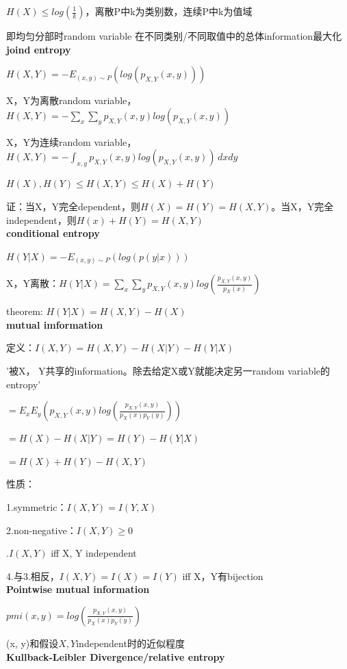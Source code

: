 \documentclass[UTF8]{ctexart}
\begin{document}
  \quad \quad $H(X) \leq log(\frac{1}{k})$，离散P中k为类别数，连续P中k为值域

  \quad \quad 即均匀分部时random variable 在不同类别/不同取值中的总体information最大化\\
\textbf{joind entropy}

  $H(X, Y) = -E_{(x, y) \sim P}(log(p_{X, Y}(x, y)))$

  X，Y为离散random variable，$H(X, Y) = -\sum_x\sum_yp_{X, Y}(x, y)log(p_{X, Y}(x, y))$

  X，Y为连续random variable，$H(X, Y) = -\int_{x, y} p_{X, Y}(x, y)log(p_{X, Y}(x, y)) \,dxdy$

  $H(X), H(Y) \leq H(X, Y) \leq H(X) + H(Y)$
  
  \quad 证：当X，Y完全dependent，则$H(X) = H(Y) = H(X, Y)$。当X，Y完全independent，则$H(x) + H(Y) = H(X, Y)$\\
\textbf{conditional entropy}

  $H(Y | X) = -E_{(x, y) \sim P}(log(p(y | x)))$

  X，Y离散：$H(Y | X) = \sum_x\sum_yp_{X, Y}(x, y)log(\frac{p_{X, Y}(x, y)}{p_X(x)})$

  theorem: $H(Y | X) = H(X, Y) - H(X)$\\
\textbf{mutual imformation}

  定义：$I(X, Y) = H(X, Y) - H(X | Y) - H(Y | X)$

  \quad '被X， Y共享的information。除去给定X或Y就能决定另一random variable的entropy'

  \quad $ = E_xE_y(p_{X, Y}(x, y)log(\frac{p_{X, Y}(x, y)}{p_X(x)p_Y(y)}))$

  \quad $ = H(X) - H(X | Y) = H(Y) - H(Y | X)$

  \quad $ = H(X) + H(Y) - H(X, Y)$

  性质：

  \quad 1.symmetric：$I(X, Y) = I(Y, X)$

  \quad 2.non-negative：$I(X, Y) \geq 0$

  .$I(X, Y)$ iff X, Y independent

  \quad 4.与3.相反，$I(X, Y) = I(X) = I(Y)$ iff X，Y有bijection\\
\textbf{Pointwise mutual information}

  $pmi(x, y) = log(\frac{p_{X, Y}(x, y)}{p_X(x)p_Y(y)})$

  (x, y)和假设$X, Y$independent时的近似程度\\
\textbf{Kullback-Leibler Divergence/relative entropy}
\end{document}
